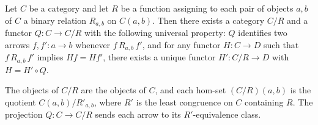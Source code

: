 Let $C$ be a category and let $R$ be a function assigning to each pair of objects $a, b$ of $C$ a binary relation $R_{a,b}$ on $C(a, b)$. Then there exists a category $C/R$ and a functor $Q : C \to C/R$ with the following universal property: $Q$ identifies two arrows $f, f' : a \to b$ whenever $f \, R_{a,b} \, f'$, and for any functor $H : C \to D$ such that $f \, R_{a,b} \, f'$ implies $H f = H f'$, there exists a unique functor $H' : C/R \to D$ with $H = H' \circ Q$.

The objects of $C/R$ are the objects of $C$, and each hom-set $(C/R)(a, b)$ is the quotient $C(a, b) / R'_{a,b}$, where $R'$ is the least congruence on $C$ containing $R$. The projection $Q : C \to C/R$ sends each arrow to its $R'$-equivalence class.
